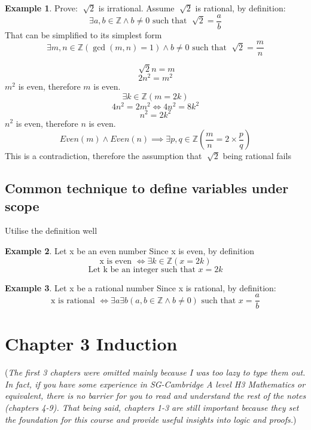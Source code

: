 \documentclass[14pt]{article}
\theoremstyle{definition}
\newtheorem*{example}{Example}
\begin{document}
\begin{example}
    Prove: \(\sqrt[]{2}\) is irrational.
    Assume \(\sqrt[]{2}\) is rational, by definition:
    \[\exists a, b \in \mathbb{Z} \land b \neq 0 \text{ such that }\sqrt[]{2} = \frac{a}{b}\]
    That can be simplified to its simplest form 
    \[\exists m, n \in \mathbb{Z}(\gcd(m, n) = 1) \land b \neq 0 \text{ such that }\sqrt[]{2} = \frac{m}{n}\]
    
    \[\sqrt[]{2}n = m\]
    \[2n^2 = m^2\]
    \(m^2\) is even, therefore \(m\) is even. 
    \[\exists k \in \mathbb{Z}(m = 2k)\]
    \[4n^2 = 2m^2 \iff 4n^2 = 8k^2\]
    \[n^2 = 2k^2\]
    \(n^2\) is even, therefore \(n\) is even. 
    \[Even(m) \land Even(n) \implies \exists p, q \in \mathbb{Z} (\frac{m}{n} = 2 \times \frac{p}{q})\]
    This is a contradiction, therefore the assumption that \(\sqrt[]{2}\) being rational fails
\end{example}

\subsubsection{}
\subsubsection{}
\newpage
\subsection*{Common technique to define variables under scope}
Utilise the definition well

\begin{example}
    Let x be an even number
    Since x is even, by definition 
    \[\text{x is even } \iff \exists k \in \mathbb{Z} (x = 2k)\]
    \[\text{Let k be an integer such that } x = 2k\]
\end{example}

\begin{example}
    Let x be a rational number
    Since x is rational, by definition:
    \[\text{x is rational } \iff \exists a \exists b (a, b \in \mathbb{Z} \land b \neq 0) \text{ such that } x = \frac{a}{b}\]
\end{example}

\section{Chapter 3 Induction}

(\textit{The first 3 chapters were omitted mainly because I was too lazy to type them out.
In fact, if you have some experience in SG-Cambridge A level H3 Mathematics or equivalent, 
there is no barrier for you to read and understand the rest of the notes (chapters
4-9). That being said,
chapters 1-3 are still important because they set the foundation for 
this course and provide useful insights into logic and proofs.})
\end{document}
